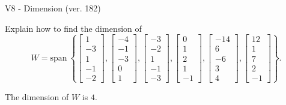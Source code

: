 \begin{exercise}
  \begin{exerciseTitle}V8 - Dimension (ver. 182)\end{exerciseTitle}
  \begin{exerciseStatement}
    Explain how to find the dimension of 
\[W=\mathrm{span}\ \left\{\left[\begin{array}{r}
1 \\
-3 \\
1 \\
-1 \\
-2
\end{array}\right] , \left[\begin{array}{r}
-4 \\
-1 \\
-3 \\
0 \\
1
\end{array}\right] , \left[\begin{array}{r}
-3 \\
-2 \\
1 \\
-1 \\
-3
\end{array}\right] , \left[\begin{array}{r}
0 \\
1 \\
2 \\
1 \\
-1
\end{array}\right] , \left[\begin{array}{r}
-14 \\
6 \\
-6 \\
3 \\
4
\end{array}\right] , \left[\begin{array}{r}
12 \\
1 \\
7 \\
2 \\
-1
\end{array}\right]\right\}.\]



  \end{exerciseStatement}
  \begin{exerciseAnswer}
   The dimension of \(W\) is  \(4\).
  


  \end{exerciseAnswer}
\end{exercise}